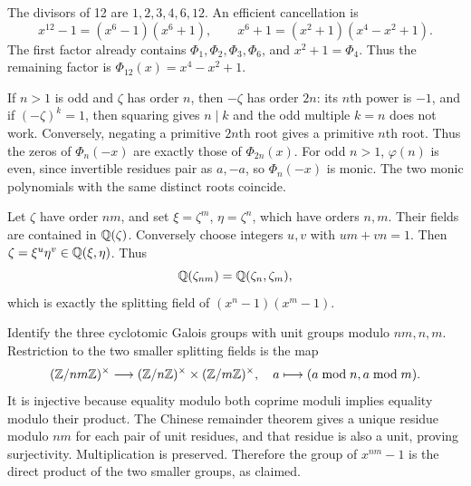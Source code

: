 The divisors of 12 are $1,2,3,4,6,12$. An efficient cancellation is
\[x^{12}-1=(x^6-1)(x^6+1),\qquad x^6+1=(x^2+1)(x^4-x^2+1).\]
The first factor already contains $\Phi_1,\Phi_2,\Phi_3,\Phi_6$, and $x^2+1=\Phi_4$. Thus the remaining factor is $\Phi_{12}(x)=x^4-x^2+1$.

If $n>1$ is odd and $\zeta$ has order $n$, then $-\zeta$ has order $2n$: its $n$th power is $-1$, and if $(-\zeta)^k=1$, then squaring gives $n\mid k$ and the odd multiple $k=n$ does not work. Conversely, negating a primitive $2n$th root gives a primitive $n$th root. Thus the zeros of $\Phi_n(-x)$ are exactly those of $\Phi_{2n}(x)$. For odd $n>1$, $\varphi(n)$ is even, since invertible residues pair as $a,-a$, so $\Phi_n(-x)$ is monic. The two monic polynomials with the same distinct roots coincide.

Let $\zeta$ have order $nm$, and set $\xi=\zeta^m$, $\eta=\zeta^n$, which have orders $n,m$. Their fields are contained in $\mathbb{Q}(\zeta)$. Conversely choose integers $u,v$ with $um+vn=1$. Then $\zeta=\xi^u\eta^v\in\mathbb{Q}(\xi,\eta)$. Thus
\[\mathbb{Q}(\zeta_{nm})=\mathbb{Q}(\zeta_n,\zeta_m),\]
which is exactly the splitting field of $(x^n-1)(x^m-1)$.

Identify the three cyclotomic Galois groups with unit groups modulo $nm,n,m$. Restriction to the two smaller splitting fields is the map
\[(\mathbb{Z}/nm\mathbb{Z})^\times\longrightarrow(\mathbb{Z}/n\mathbb{Z})^\times\times(\mathbb{Z}/m\mathbb{Z})^\times,\quad a\longmapsto(a\bmod n,a\bmod m).\]
It is injective because equality modulo both coprime moduli implies equality modulo their product. The Chinese remainder theorem gives a unique residue modulo $nm$ for each pair of unit residues, and that residue is also a unit, proving surjectivity. Multiplication is preserved. Therefore the group of $x^{nm}-1$ is the direct product of the two smaller groups, as claimed.
